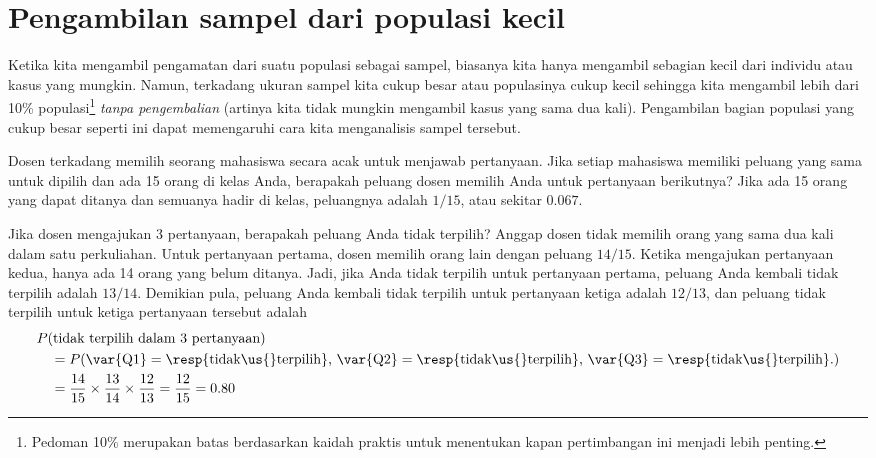 \section{Pengambilan sampel dari populasi kecil}
\label{smallPop}

\noindent%
Ketika kita mengambil pengamatan dari suatu populasi sebagai sampel,
biasanya kita hanya mengambil sebagian kecil dari
individu atau kasus yang mungkin.
Namun, terkadang ukuran sampel kita cukup besar
atau populasinya cukup kecil sehingga kita
mengambil lebih dari 10\% populasi\footnote{Pedoman 10\%
  merupakan batas berdasarkan kaidah praktis untuk menentukan kapan
  pertimbangan ini menjadi lebih penting.}
\emph{tanpa
pengembalian} (artinya kita tidak mungkin
mengambil kasus yang sama dua kali).
Pengambilan bagian populasi yang cukup besar seperti ini
dapat memengaruhi cara kita menganalisis
sampel tersebut.

\begin{examplewrap}
\begin{nexample}{Dosen terkadang memilih seorang mahasiswa secara acak untuk menjawab pertanyaan. Jika setiap mahasiswa memiliki peluang yang sama untuk dipilih dan ada 15 orang di kelas Anda, berapakah peluang dosen memilih Anda untuk pertanyaan berikutnya?}
Jika ada 15 orang yang dapat ditanya dan semuanya hadir di kelas, peluangnya adalah $1/15$, atau sekitar $0.067$.
\end{nexample}
\end{examplewrap}

\begin{examplewrap}
\begin{nexample}{Jika dosen mengajukan 3 pertanyaan, berapakah peluang Anda tidak terpilih? Anggap dosen tidak memilih orang yang sama dua kali dalam satu perkuliahan.}\label{3woRep}
Untuk pertanyaan pertama, dosen memilih orang lain dengan peluang $14/15$. Ketika mengajukan pertanyaan kedua, hanya ada 14 orang yang belum ditanya. Jadi, jika Anda tidak terpilih untuk pertanyaan pertama, peluang Anda kembali tidak terpilih adalah $13/14$. Demikian pula, peluang Anda kembali tidak terpilih untuk pertanyaan ketiga adalah $12/13$, dan peluang tidak terpilih untuk ketiga pertanyaan tersebut adalah
\begin{align*}
&P(\text{tidak terpilih dalam 3 pertanyaan}) \\
&\quad = P(\text{\var{Q1}} = \text{\resp{tidak\us{}terpilih}, }\text{\var{Q2}} = \text{\resp{tidak\us{}terpilih}, }\text{\var{Q3}} = \text{\resp{tidak\us{}terpilih}.}) \\
&\quad = \frac{14}{15}\times\frac{13}{14}\times\frac{12}{13} = \frac{12}{15} = 0.80
\end{align*}
\end{nexample}
\end{examplewrap}

